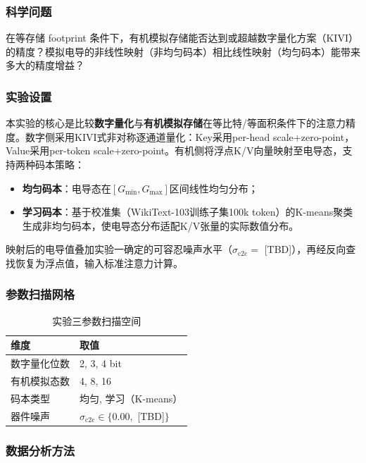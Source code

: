 \subsubsection{科学问题}

在等存储 footprint 条件下，有机模拟存储能否达到或超越数字量化方案（KIVI）的精度？模拟电导的非线性映射（非均匀码本）相比线性映射（均匀码本）能带来多大的精度增益？

\subsubsection{实验设置}

本实验的核心是比较\textbf{数字量化}与\textbf{有机模拟存储}在等比特/等面积条件下的注意力精度。数字侧采用KIVI式非对称逐通道量化：Key采用per-head scale+zero-point，Value采用per-token scale+zero-point。有机侧将浮点K/V向量映射至电导态，支持两种码本策略：

\begin{itemize}
    \item \textbf{均匀码本}：电导态在$[G_{\min}, G_{\max}]$区间线性均匀分布；
    \item \textbf{学习码本}：基于校准集（WikiText-103训练子集100k token）的K-means聚类生成非均匀码本，使电导态分布适配K/V张量的实际数值分布。
\end{itemize}

映射后的电导值叠加实验一确定的可容忍噪声水平（$\sigma_{\text{c2c}} = $ [TBD]），再经反向查找恢复为浮点值，输入标准注意力计算。

\subsubsection{参数扫描网格}

\begin{table}[htbp]
\centering
\caption{实验三参数扫描空间}
\label{tab:exp3_grid}
\begin{tabular}{ll}
\toprule
维度 & 取值 \\
\midrule
数字量化位数 & 2, 3, 4 bit \\
有机模拟态数 & 4, 8, 16 \\
码本类型 & 均匀, 学习（K-means） \\
器件噪声 & $\sigma_{\text{c2c}} \in \{0.00, $ [TBD]$\}$ \\
\bottomrule
\end{tabular}
\end{table}

\subsubsection{数据分析方法}

